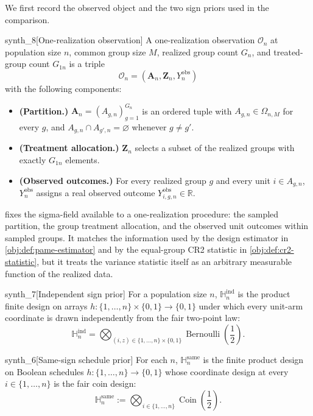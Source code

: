 \documentclass[11pt]{article}
\begin{document}
We first record the observed object and the two sign priors used in the comparison.

\begin{definitionv}{synth_8}[One-realization observation]
A one-realization observation \(\mathcal O_n\) at population size \(n\), common group size \(M\), realized group count \(G_n\), and treated-group count \(G_{1n}\) is a triple
\[
\mathcal O_n=(\mathbf A_n,\mathbf Z_n,Y^{\mathrm{obs}}_n)
\]
with the following components:
\begin{itemize}
\item \textbf{(Partition.)} \(\mathbf A_n=(A_{g,n})_{g=1}^{G_n}\) is an ordered tuple with \(A_{g,n}\in\Omega_{n,M}\) for every \(g\), and \(A_{g,n}\cap A_{g',n}=\varnothing\) whenever \(g\ne g'\).
\item \textbf{(Treatment allocation.)} \(\mathbf Z_n\) selects a subset of the realized groups with exactly \(G_{1n}\) elements.
\item \textbf{(Observed outcomes.)} For every realized group \(g\) and every unit \(i\in A_{g,n}\), \(Y^{\mathrm{obs}}_n\) assigns a real observed outcome \(Y^{\mathrm{obs}}_{i,g,n}\in\mathbb R\).
\end{itemize}
\end{definitionv}

 fixes the sigma-field available to a one-realization procedure: the sampled partition, the group treatment allocation, and the observed unit outcomes within sampled groups. It matches the information used by the design estimator in \cref{obj:def:pame-estimator} and by the equal-group CR2 statistic in \cref{obj:def:cr2-statistic}, but it treats the variance statistic itself as an arbitrary measurable function of the realized data.

\begin{definitionv}{synth_7}[Independent sign prior]
For a population size \(n\), \(\mathbb H_n^{\mathrm{ind}}\) is the product finite design on arrays \(h:\{1,\ldots,n\}\times\{0,1\}\to\{0,1\}\) under which every unit-arm coordinate is drawn independently from the fair two-point law:
\[
\mathbb H_n^{\mathrm{ind}}
=
\bigotimes_{(i,z)\in \{1,\ldots,n\}\times\{0,1\}}
\operatorname{Bernoulli}\!\left(\frac12\right).
\]
\end{definitionv}

\begin{definitionv}{synth_6}[Same-sign schedule prior]
For each \(n\), \(\mathbb H_n^{\mathrm{same}}\) is the finite product design on Boolean schedules \(h:\{1,\ldots,n\}\to\{0,1\}\) whose coordinate design at every \(i\in\{1,\ldots,n\}\) is the fair coin design:
\[
\mathbb H_n^{\mathrm{same}}
:=
\bigotimes_{i\in\{1,\ldots,n\}}
\operatorname{Coin}\!\left(\frac12\right).
\]
\end{definitionv}
\end{document}
